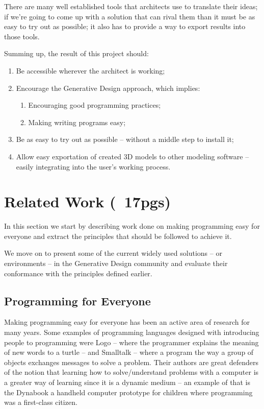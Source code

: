 \documentclass{./llncs2e/llncs}
\begin{document}
There are many well established tools that architects use to translate their ideas; if we're going to come up with a solution that can rival them than it must be as easy to try out as possible; it also has to provide a way to export results into those tools.

Summing up, the result of this project should:
\begin{enumerate}
	\item Be accessible wherever the architect is working; \label{obj:access}
	\item Encourage the Generative Design approach, which implies: \label{obj:gen-design}
	\begin{enumerate}
		\item Encouraging good programming practices; \label{obj:good-prog-practs} 
		\item Making writing programs easy; \label{obj:easy-program}
	\end{enumerate}
	\item Be as easy to try out as possible -- without a middle step to install it; \label{obj:no-install}
	\item Allow easy exportation of created 3D models to other modeling software -- easily integrating into the user's working process. \label{obj:inter-op}
\end{enumerate}


\section{Related Work (~17pgs)}
In this section we start by describing work done on making programming easy for everyone and extract the principles that should be followed to achieve it.

We move on to present some of the current widely used solutions -- or environments -- in the Generative Design community and evaluate their conformance with the principles defined earlier.

\subsection{Programming for Everyone}
Making programming easy for everyone has been an active area of research for many years. Some examples of programming languages designed with introducing people to programming were Logo\cite{papert1999logo} -- where the programmer explains the meaning of new words to a turtle -- and Smalltalk\cite{goldberg1983smalltalk} -- where a program the way a group of objects exchanges messages to solve a problem. Their authors are great defenders of the notion that learning how to solve/understand problems with a computer is a greater way of learning since it is a dynamic medium -- an example of that is the Dynabook\cite{Kay:2011:PCC:800193.1971922} a handheld computer prototype for children where programming was a first-class citizen.
\end{document}

